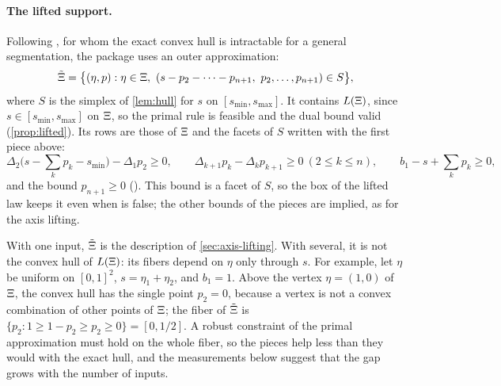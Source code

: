 \paragraph{The lifted support.}
Following \citet{GWK2015}, for whom the exact convex hull is intractable for a general segmentation, the package uses an outer approximation:
\[
\tilde\Xi = \bigl\{ (\eta, p) : \eta \in \Xi,\ (s - p_2 - \dots - p_{n+1},\ p_2, \dots, p_{n+1}) \in S \bigr\},
\]
where $S$ is the simplex of \cref{lem:hull} for $s$ on $[s_{\min}, s_{\max}]$.
It contains $L(\Xi)$, since $s \in [s_{\min}, s_{\max}]$ on $\Xi$, so the primal rule is feasible and the dual bound valid (\cref{prop:lifted}).
Its rows are those of $\Xi$ and the facets of $S$ written with the first piece above:
\[
\Delta_2\bigl(s - \textstyle\sum_k p_k - s_{\min}\bigr) - \Delta_1 p_2 \ge 0, \qquad
\Delta_{k+1}p_k - \Delta_k p_{k+1} \ge 0 \ (2 \le k \le n), \qquad
b_1 - s + \textstyle\sum_k p_k \ge 0,
\]
and the bound $p_{n+1} \ge 0$ ().
This bound is a facet of $S$, so the box of the lifted law keeps it even when  is false;
the other bounds of the pieces are implied, as for the axis lifting.

With one input, $\tilde\Xi$ is the description of \cref{sec:axis-lifting}.
With several, it is not the convex hull of $L(\Xi)$: its fibers depend on $\eta$ only through $s$.
For example, let $\eta$ be uniform on $[0, 1]^2$, $s = \eta_1 + \eta_2$, and $b_1 = 1$.
Above the vertex $\eta = (1, 0)$ of $\Xi$, the convex hull has the single point $p_2 = 0$, because a vertex is not a convex combination of other points of $\Xi$;
the fiber of $\tilde\Xi$ is $\{p_2 : 1 \ge 1 - p_2 \ge p_2 \ge 0\} = [0, 1/2]$.
A robust constraint of the primal approximation must hold on the whole fiber,
so the pieces help less than they would with the exact hull, and the measurements below suggest that the gap grows with the number of inputs.

